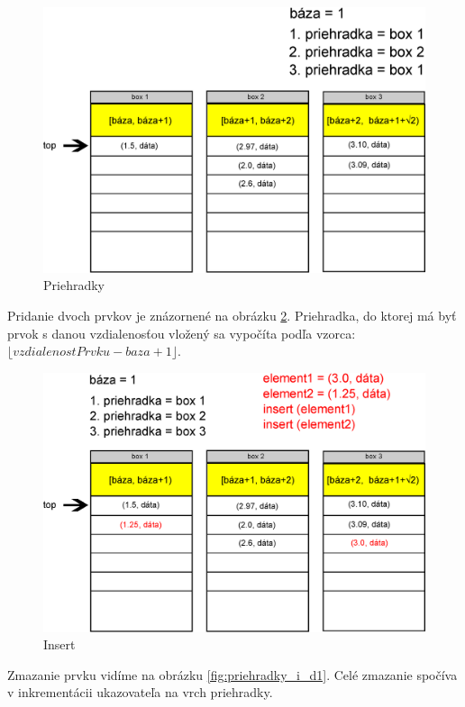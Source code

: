 \begin{figure}[h]
\centering
\includegraphics[width=\textwidth]{./img/priehradky_naplnene_default.eps}
\caption{Priehradky}
\label{fig:priehradky}
\end{figure}

Pridanie dvoch prvkov je znázornené na obrázku \ref{fig:priehradky_i}. Priehradka, do ktorej má byť prvok s danou vzdialenosťou vložený sa vypočíta podľa vzorca: $ \lfloor vzdialenostPrvku - baza +1 \rfloor $.


\begin{figure}[h]
\centering
\includegraphics[width=\textwidth]{./img/priehradky_naplnene_default_i.eps}
\caption{Insert}
\label{fig:priehradky_i}
\end{figure}


Zmazanie prvku vidíme na obrázku \ref{fig:priehradky_i_d1}.
Celé zmazanie spočíva v inkrementácii ukazovateľa na vrch priehradky.

